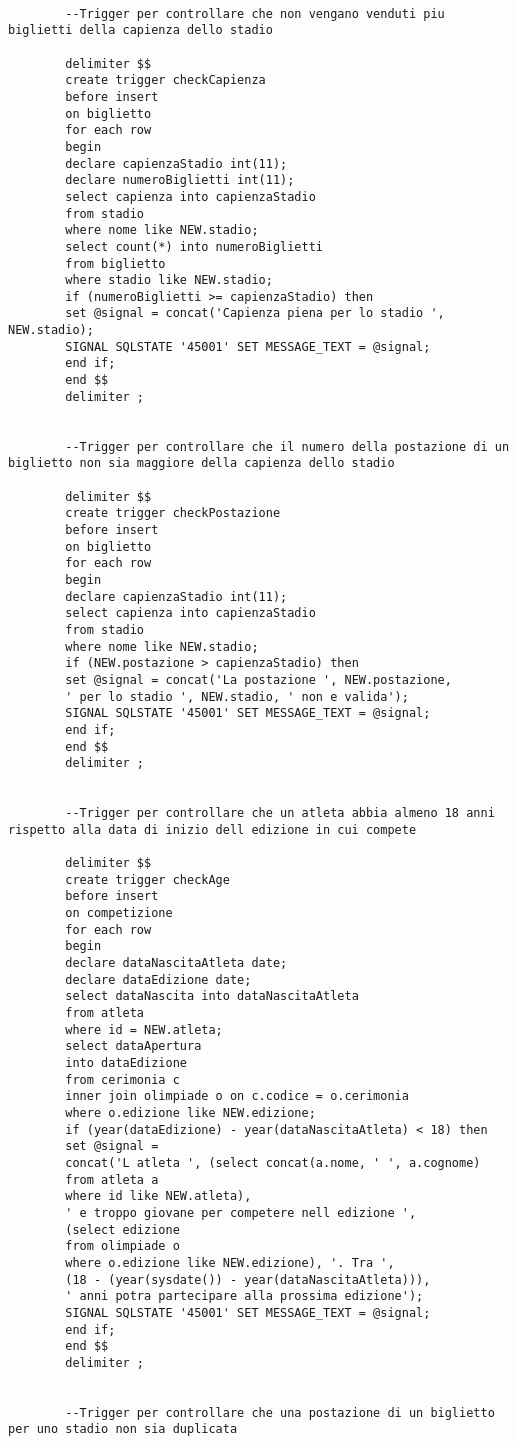 \documentclass[paper=a4, fontsize=12 pt]{scrartcl} %
\begin{document}
\begin{lstlisting}[deletekeywords={IDENTITY,INT},
		morekeywords={clustered},    
		framesep=10pt,
		framextopmargin=10pt]
		
		--Trigger per controllare che non vengano venduti piu biglietti della capienza dello stadio
		
		delimiter $$
		create trigger checkCapienza
		before insert
		on biglietto
		for each row
		begin
		declare capienzaStadio int(11);
		declare numeroBiglietti int(11);
		select capienza into capienzaStadio 
		from stadio
		where nome like NEW.stadio;
		select count(*) into numeroBiglietti 
		from biglietto 
		where stadio like NEW.stadio;
		if (numeroBiglietti >= capienzaStadio) then
		set @signal = concat('Capienza piena per lo stadio ', NEW.stadio);
		SIGNAL SQLSTATE '45001' SET MESSAGE_TEXT = @signal;
		end if;
		end $$
		delimiter ;
		
		
		--Trigger per controllare che il numero della postazione di un biglietto non sia maggiore della capienza dello stadio
		
		delimiter $$
		create trigger checkPostazione
		before insert
		on biglietto
		for each row
		begin
		declare capienzaStadio int(11);
		select capienza into capienzaStadio 
		from stadio 
		where nome like NEW.stadio;
		if (NEW.postazione > capienzaStadio) then
		set @signal = concat('La postazione ', NEW.postazione, 
		' per lo stadio ', NEW.stadio, ' non e valida');
		SIGNAL SQLSTATE '45001' SET MESSAGE_TEXT = @signal;
		end if;
		end $$
		delimiter ;
		
		
		--Trigger per controllare che un atleta abbia almeno 18 anni rispetto alla data di inizio dell edizione in cui compete
		
		delimiter $$
		create trigger checkAge
		before insert
		on competizione
		for each row
		begin
		declare dataNascitaAtleta date;
		declare dataEdizione date;
		select dataNascita into dataNascitaAtleta 
		from atleta 
		where id = NEW.atleta;
		select dataApertura
		into dataEdizione
		from cerimonia c
		inner join olimpiade o on c.codice = o.cerimonia
		where o.edizione like NEW.edizione;
		if (year(dataEdizione) - year(dataNascitaAtleta) < 18) then
		set @signal =
		concat('L atleta ', (select concat(a.nome, ' ', a.cognome) 
		from atleta a 
		where id like NEW.atleta),
		' e troppo giovane per competere nell edizione ',
		(select edizione 
		from olimpiade o 
		where o.edizione like NEW.edizione), '. Tra ',
		(18 - (year(sysdate()) - year(dataNascitaAtleta))),
		' anni potra partecipare alla prossima edizione');
		SIGNAL SQLSTATE '45001' SET MESSAGE_TEXT = @signal;
		end if;
		end $$
		delimiter ;
		
		
		--Trigger per controllare che una postazione di un biglietto per uno stadio non sia duplicata
		

\end{lstlisting}
\end{document}
